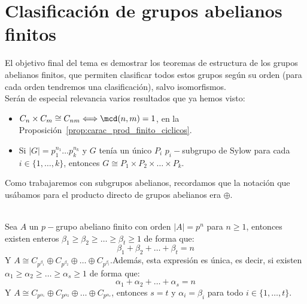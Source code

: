 \chapter{Clasificación de grupos abelianos finitos}
\noindent
El objetivo final del tema es demostrar los teoremas de estructura de los grupos abelianos finitos, que permiten clasificar todos estos grupos según su orden (para cada orden tendremos una clasificación), salvo isomorfismos.\\

Serán de especial relevancia varios resultados que ya hemos visto: %
\begin{itemize}
    \item $C_n\times C_m \cong C_{nm} \Longleftrightarrow \mcd(n,m) = 1$, en la Proposición~\ref{prop:carac_prod_finito_ciclicos}.
    \item Si $|G| = p_1^{n_1} \ldots p_k^{n_k}$ y $G$ tenía un único $P_i$ $p_i-$subgrupo de Sylow para cada $i \in \{1,\ldots,k\}$, entonces $G\cong P_1\times P_2\times \ldots \times P_k$.
\end{itemize}
Como trabajaremos con subgrupos abelianos, recordamos que la notación que usábamos para el producto directo de grupos abelianos era $\oplus$.

\begin{teo}\label{teo:1_tema6}\ \\
    Sea $A$ un $p-$grupo abeliano finito con orden $|A| = p^n$ para $n\geq 1$, entonces existen enteros $\beta_1\geq \beta_2 \geq \ldots \geq \beta_t \geq 1$ de forma que:
    \begin{equation*}
        \beta_1 + \beta_2 + \ldots + \beta_t = n
    \end{equation*}
    Y $A\cong C_{p^{\beta_1}} \oplus C_{p^{\beta_2}} \oplus \ldots \oplus C_{p^{\beta_t}}$.\newline Además, esta expresión es única, es decir, si existen $\alpha_1\geq \alpha_2\geq \ldots \geq \alpha_s \geq 1$ de forma que:
    \begin{equation*}
        \alpha_1 + \alpha_2 + \ldots + \alpha_s = n
    \end{equation*}
    Y $A\cong C_{p^{\alpha_1}} \oplus C_{p^{\alpha_2}} \oplus \ldots \oplus C_{p^{\alpha_s}}$, entonces $s = t$ y $\alpha_i = \beta_i$ para todo $i \in \{1,\ldots,t\}$.
\end{teo}

